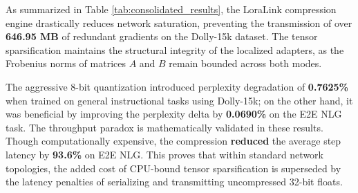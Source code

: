 \documentclass{ieeeaccess}
\begin{document}
\begin{table}[htbp]
\centering
\caption{Compression Ablation: Perplexity, Weight Stability, and Throughput (Topology B)}
\label{tab:consolidated_results}
\end{table}

As summarized in Table \ref{tab:consolidated_results}, the LoraLink compression engine drastically reduces network saturation, preventing the transmission of over \textbf{646.95 MB} of redundant gradients on the Dolly-15k dataset. The tensor sparsification maintains the structural integrity of the localized adapters, as the Frobenius norms of matrices $A$ and $B$ remain bounded across both modes.

The aggressive 8-bit quantization introduced perplexity degradation of \textbf{0.7625\%} when trained on general instructional tasks using Dolly-15k; on the other hand, it was beneficial by improving the perplexity delta by \textbf{0.0690\%} on the E2E NLG task. The throughput paradox is mathematically validated in these results. Though computationally expensive, the compression \textbf{reduced} the average step latency by \textbf{93.6\%} on E2E NLG. This proves that within standard network topologies, the added cost of CPU-bound tensor sparsification is superseded by the latency penalties of serializing and transmitting uncompressed 32-bit floats.
\end{document}
